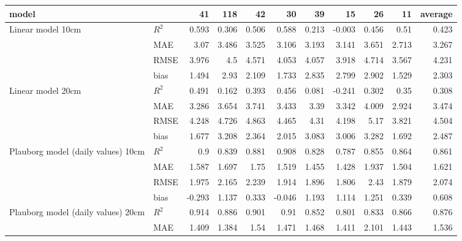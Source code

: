 \begin{tabular}{llrrrrrrrrr}
\hline
 model                               &       &     41 &   118 &     42 &     30 &    39 &     15 &    26 &     11 &   average \\
\hline
 Linear model 10cm                   & $R^2$ &  0.593 & 0.306 &  0.506 &  0.588 & 0.213 & -0.003 & 0.456 &  0.51  &     0.423 \\
                                     & MAE   &  3.07  & 3.486 &  3.525 &  3.106 & 3.193 &  3.141 & 3.651 &  2.713 &     3.267 \\
                                     & RMSE  &  3.976 & 4.5   &  4.571 &  4.053 & 4.057 &  3.918 & 4.714 &  3.567 &     4.231 \\
                                     & bias  &  1.494 & 2.93  &  2.109 &  1.733 & 2.835 &  2.799 & 2.902 &  1.529 &     2.303 \\
 Linear model 20cm                   & $R^2$ &  0.491 & 0.162 &  0.393 &  0.456 & 0.081 & -0.241 & 0.302 &  0.35  &     0.308 \\
                                     & MAE   &  3.286 & 3.654 &  3.741 &  3.433 & 3.39  &  3.342 & 4.009 &  2.924 &     3.474 \\
                                     & RMSE  &  4.248 & 4.726 &  4.863 &  4.465 & 4.31  &  4.198 & 5.17  &  3.821 &     4.504 \\
                                     & bias  &  1.677 & 3.208 &  2.364 &  2.015 & 3.083 &  3.006 & 3.282 &  1.692 &     2.487 \\
 Plauborg model (daily values) 10cm  & $R^2$ &  0.9   & 0.839 &  0.881 &  0.908 & 0.828 &  0.787 & 0.855 &  0.864 &     0.861 \\
                                     & MAE   &  1.587 & 1.697 &  1.75  &  1.519 & 1.455 &  1.428 & 1.937 &  1.504 &     1.621 \\
                                     & RMSE  &  1.975 & 2.165 &  2.239 &  1.914 & 1.896 &  1.806 & 2.43  &  1.879 &     2.074 \\
                                     & bias  & -0.293 & 1.137 &  0.333 & -0.046 & 1.193 &  1.114 & 1.251 &  0.339 &     0.608 \\
 Plauborg model (daily values) 20cm  & $R^2$ &  0.914 & 0.886 &  0.901 &  0.91  & 0.852 &  0.801 & 0.833 &  0.866 &     0.876 \\
                                     & MAE   &  1.409 & 1.384 &  1.54  &  1.471 & 1.468 &  1.411 & 2.101 &  1.443 &     1.536 \\

\end{tabular}
